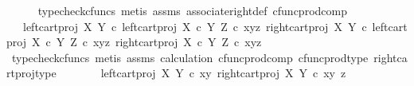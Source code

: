 \begin{isabellebody}
\ \ \ \ \isamarkupfalse%
\ {\isacharparenleft}{\kern0pt}typecheck{\isacharunderscore}{\kern0pt}cfuncs{\isacharcomma}{\kern0pt}\ metis\ assms\ associate{\isacharunderscore}{\kern0pt}right{\isacharunderscore}{\kern0pt}def\ cfunc{\isacharunderscore}{\kern0pt}prod{\isacharunderscore}{\kern0pt}comp{\isacharparenright}{\kern0pt}\isanewline
\ \ \isamarkupfalse%
\ \isamarkupfalse%
\ {\isachardoublequoteopen}{\isachardot}{\kern0pt}{\isachardot}{\kern0pt}{\isachardot}{\kern0pt}\ {\isacharequal}{\kern0pt}\ {\isasymlangle}{\isacharparenleft}{\kern0pt}left{\isacharunderscore}{\kern0pt}cart{\isacharunderscore}{\kern0pt}proj\ X\ Y\ {\isasymcirc}\isactrlsub c\ left{\isacharunderscore}{\kern0pt}cart{\isacharunderscore}{\kern0pt}proj\ {\isacharparenleft}{\kern0pt}X\ {\isasymtimes}\isactrlsub c\ Y{\isacharparenright}{\kern0pt}\ Z{\isacharparenright}{\kern0pt}\ {\isasymcirc}\isactrlsub c\ {\isasymlangle}{\isasymlangle}x{\isacharcomma}{\kern0pt}y{\isasymrangle}{\isacharcomma}{\kern0pt}z{\isasymrangle}{\isacharcomma}{\kern0pt}\ {\isasymlangle}{\isacharparenleft}{\kern0pt}right{\isacharunderscore}{\kern0pt}cart{\isacharunderscore}{\kern0pt}proj\ X\ Y\ {\isasymcirc}\isactrlsub c\ left{\isacharunderscore}{\kern0pt}cart{\isacharunderscore}{\kern0pt}proj\ {\isacharparenleft}{\kern0pt}X\ {\isasymtimes}\isactrlsub c\ Y{\isacharparenright}{\kern0pt}\ Z{\isacharparenright}{\kern0pt}\ {\isasymcirc}\isactrlsub c\ {\isasymlangle}{\isasymlangle}x{\isacharcomma}{\kern0pt}y{\isasymrangle}{\isacharcomma}{\kern0pt}z{\isasymrangle}{\isacharcomma}{\kern0pt}\ right{\isacharunderscore}{\kern0pt}cart{\isacharunderscore}{\kern0pt}proj\ {\isacharparenleft}{\kern0pt}X\ {\isasymtimes}\isactrlsub c\ Y{\isacharparenright}{\kern0pt}\ Z\ {\isasymcirc}\isactrlsub c\ {\isasymlangle}{\isasymlangle}x{\isacharcomma}{\kern0pt}y{\isasymrangle}{\isacharcomma}{\kern0pt}z{\isasymrangle}{\isasymrangle}{\isasymrangle}{\isachardoublequoteclose}\isanewline
\ \ \ \ \isamarkupfalse%
\ {\isacharparenleft}{\kern0pt}typecheck{\isacharunderscore}{\kern0pt}cfuncs{\isacharcomma}{\kern0pt}\ metis\ assms\ calculation\ cfunc{\isacharunderscore}{\kern0pt}prod{\isacharunderscore}{\kern0pt}comp\ cfunc{\isacharunderscore}{\kern0pt}prod{\isacharunderscore}{\kern0pt}type\ right{\isacharunderscore}{\kern0pt}cart{\isacharunderscore}{\kern0pt}proj{\isacharunderscore}{\kern0pt}type{\isacharparenright}{\kern0pt}\isanewline
\ \ \isamarkupfalse%
\ \isamarkupfalse%
\ {\isachardoublequoteopen}{\isachardot}{\kern0pt}{\isachardot}{\kern0pt}{\isachardot}{\kern0pt}\ {\isacharequal}{\kern0pt}\ {\isasymlangle}left{\isacharunderscore}{\kern0pt}cart{\isacharunderscore}{\kern0pt}proj\ X\ Y\ {\isasymcirc}\isactrlsub c\ {\isasymlangle}x{\isacharcomma}{\kern0pt}y{\isasymrangle}{\isacharcomma}{\kern0pt}\ {\isasymlangle}right{\isacharunderscore}{\kern0pt}cart{\isacharunderscore}{\kern0pt}proj\ X\ Y\ {\isasymcirc}\isactrlsub c\ {\isasymlangle}x{\isacharcomma}{\kern0pt}y{\isasymrangle}{\isacharcomma}{\kern0pt}\ z{\isasymrangle}{\isasymrangle}{\isachardoublequoteclose}\isanewline

\end{isabellebody}
